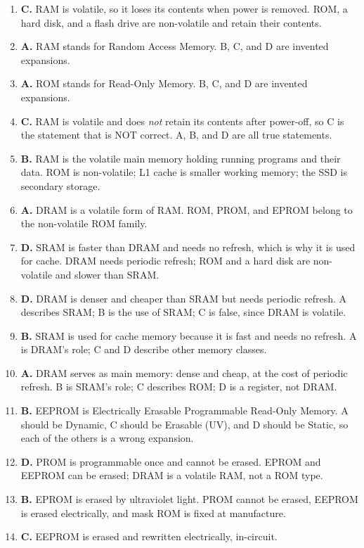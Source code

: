 \begin{enumerate}[label=\textbf{Q\arabic*.}, leftmargin=*]
\item \textbf{C.} RAM is volatile, so it loses its contents when power is
  removed. ROM, a hard disk, and a flash drive are non-volatile and retain
  their contents.
\item \textbf{A.} RAM stands for Random Access Memory. B, C, and D are
  invented expansions.
\item \textbf{A.} ROM stands for Read-Only Memory. B, C, and D are invented
  expansions.
\item \textbf{C.} RAM is volatile and does \emph{not} retain its contents
  after power-off, so C is the statement that is NOT correct. A, B, and D
  are all true statements.
\item \textbf{B.} RAM is the volatile main memory holding running programs
  and their data. ROM is non-volatile; L1 cache is smaller working memory;
  the SSD is secondary storage.
\item \textbf{A.} DRAM is a volatile form of RAM. ROM, PROM, and EPROM
  belong to the non-volatile ROM family.
\item \textbf{D.} SRAM is faster than DRAM and needs no refresh, which is
  why it is used for cache. DRAM needs periodic refresh; ROM and a hard disk
  are non-volatile and slower than SRAM.
\item \textbf{D.} DRAM is denser and cheaper than SRAM but needs periodic
  refresh. A describes SRAM; B is the use of SRAM; C is false, since DRAM is
  volatile.
\item \textbf{B.} SRAM is used for cache memory because it is fast and needs
  no refresh. A is DRAM's role; C and D describe other memory classes.
\item \textbf{A.} DRAM serves as main memory: dense and cheap, at the cost of
  periodic refresh. B is SRAM's role; C describes ROM; D is a register, not
  DRAM.
\item \textbf{B.} EEPROM is Electrically Erasable Programmable Read-Only
  Memory. A should be Dynamic, C should be Erasable (UV), and D should be
  Static, so each of the others is a wrong expansion.
\item \textbf{D.} PROM is programmable once and cannot be erased. EPROM and
  EEPROM can be erased; DRAM is a volatile RAM, not a ROM type.
\item \textbf{B.} EPROM is erased by ultraviolet light. PROM cannot be
  erased, EEPROM is erased electrically, and mask ROM is fixed at
  manufacture.
\item \textbf{C.} EEPROM is erased and rewritten electrically, in-circuit.

\end{enumerate}
